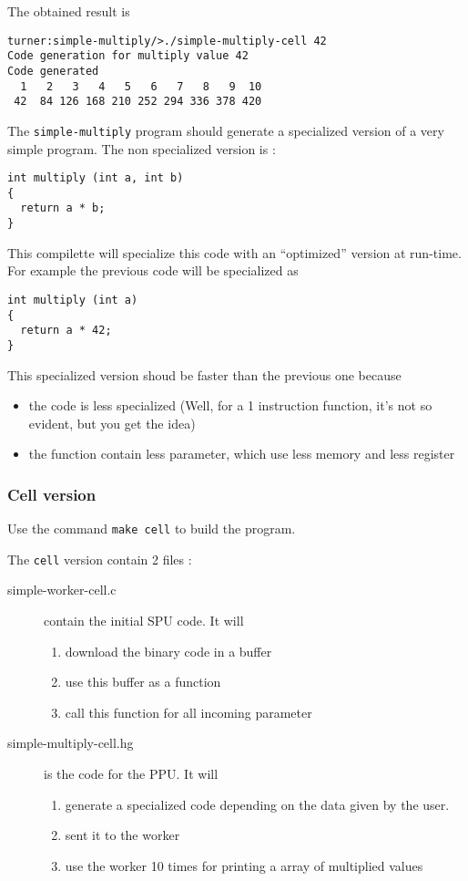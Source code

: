 \documentclass{article}
\begin{document}
The obtained result is
\begin{verbatim}
turner:simple-multiply/>./simple-multiply-cell 42
Code generation for multiply value 42
Code generated
  1   2   3   4   5   6   7   8   9  10 
 42  84 126 168 210 252 294 336 378 420 
\end{verbatim}

The \texttt{simple-multiply} program should generate a specialized
version of a very simple program. The non specialized version is :
\begin{verbatim}
int multiply (int a, int b)
{
  return a * b;
}
\end{verbatim}

This compilette will specialize this code with an ``optimized''
version at run-time. For example the previous code will be specialized
as
\begin{verbatim}
int multiply (int a)
{
  return a * 42;
}
\end{verbatim}

This specialized version shoud be faster than the previous one because
\begin{itemize}
\item the code is less specialized (Well, for a 1 instruction
  function, it's not so evident, but you get the idea)
\item the function contain less parameter, which use less memory and
  less register
\end{itemize}


\subsubsection{Cell version}

Use the command \texttt{make cell} to build the program.

The \texttt{cell} version contain 2 files :
\begin{description}
\item[simple-worker-cell.c] contain the initial SPU code. It will
  \begin{enumerate}
  \item download the binary code in a buffer
  \item use this buffer as a function
  \item call this function for all incoming parameter
  \end{enumerate}
\item[simple-multiply-cell.hg] is the code for the PPU. It will
  \begin{enumerate}
  \item generate a specialized code depending on the data given by the user.
  \item sent it to the worker
  \item use the worker 10 times for printing a array of multiplied values
  \end{enumerate}
\end{description}
\end{document}
